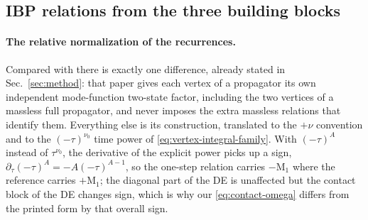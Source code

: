 \documentclass[11pt,a4paper]{article}
\begin{document}
\subsection{IBP relations from the three building blocks}
\label{sec:ibp}
\label{sec:global}

\paragraph{The relative normalization of the recurrences.}
Compared with \cite{Chen:2023iix} there is exactly one difference, already stated in
Sec.~\ref{sec:method}: that paper gives each vertex of a propagator its own independent
mode-function two-state factor, including the two vertices of a massless full propagator, and never imposes the extra
massless relations that identify them. Everything else is its construction, translated to the
$+\nu$ convention and to the $(-\tau)^{\nu_0}$ time power of \eqref{eq:vertex-integral-family}.
With $(-\tau)^{A}$ instead of $\tau^{\nu_0}$, the derivative of the explicit
power picks up a sign, $\partial_\tau(-\tau)^A=-A(-\tau)^{A-1}$, so the one-step relation carries
$-\text{M}_1$ where the reference carries $+\text{M}_1$; the diagonal part of the DE is unaffected
but the contact block of the DE changes sign, which is why our \eqref{eq:contact-omega} differs
from the printed \cite{Chen:2024glu} form by that overall sign.
\end{document}
